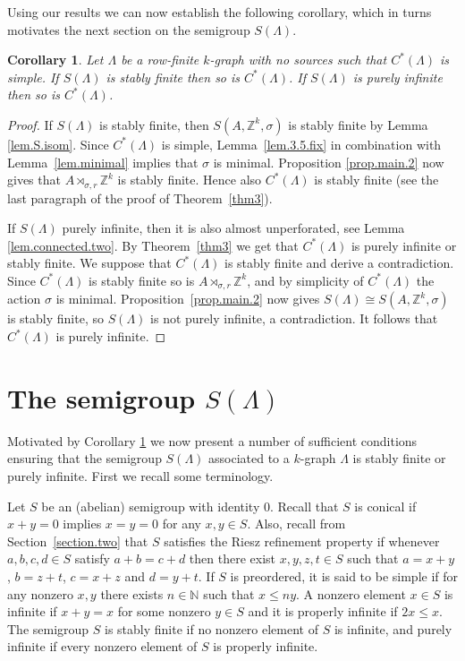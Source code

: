 \documentclass[a4paper, 12pt]{amsart}
\numberwithin{equation}{section}
\newcounter{theorem}
\newtheorem{cor}[theorem]{Corollary}
\theoremstyle{remark}
\theoremstyle{definition}
\begin{document}
Using our results we can now establish the following corollary, which in turns motivates
the next section on the semigroup $S(\Lambda)$.
\begin{cor}\label{stably.fin.purely.inf}
Let $\Lambda$ be a row-finite $k$-graph with no sources such that $C^*(\Lambda)$ is
simple. If $S(\Lambda)$ is stably finite then so is $C^*(\Lambda)$. If $S(\Lambda)$ is
purely infinite then so is $C^*(\Lambda)$.
\end{cor}
\begin{proof}
If $S(\Lambda)$ is stably finite, then $S(A,{\mathbb{Z}}^k,\sigma)$ is stably finite by Lemma
\ref{lem.S.isom}. Since $C^*(\Lambda)$ is simple, Lemma~\ref{lem.3.5.fix} in combination
with Lemma~\ref{lem.minimal} implies that $\sigma$ is minimal. Proposition
\ref{prop.main.2} now gives that $A\rtimes_{\sigma,r} {\mathbb{Z}}^k$ is stably finite. Hence also
$C^*(\Lambda)$ is stably finite (see the last paragraph of the proof of
Theorem~\ref{thm3}).

If $S(\Lambda)$ purely infinite, then it is also almost unperforated, see Lemma
\ref{lem.connected.two}. By Theorem~\ref{thm3} we get that $C^*(\Lambda)$ is purely
infinite or stably finite. We suppose that $C^*(\Lambda)$ is stably finite and derive a
contradiction. Since $C^*(\Lambda)$ is stably finite so is $A\rtimes_{\sigma,r} {\mathbb{Z}}^k$, and by
simplicity of $C^*(\Lambda)$ the action $\sigma$ is minimal. Proposition~\ref{prop.main.2}
now gives $S(\Lambda)\cong S(A,{\mathbb{Z}}^k,\sigma)$ is stably finite, so
$S(\Lambda)$ is not purely infinite, a contradiction. It follows that $C^*(\Lambda)$ is
purely infinite.
\end{proof}

\section{The semigroup \texorpdfstring{$S(\Lambda)$}{S(Lambda)}}

Motivated by Corollary \ref{stably.fin.purely.inf} we now present a number of sufficient
conditions ensuring that the semigroup $S(\Lambda)$ associated to a $k$-graph $\Lambda$
is stably finite or purely infinite. First we recall some terminology.

Let $S$ be an (abelian) semigroup with identity $0$. Recall that $S$ is conical if $x + y
= 0$ implies $x = y = 0$ for any $x,y\in S$. Also, recall from Section~\ref{section.two} that $S$ satisfies the Riesz
refinement property if whenever $a,b,c,d \in S$ satisfy $a + b = c + d$ then there exist
$x, y, z,t\in S$ such that $a = x + y$, $b = z + t$, $c = x + z$ and $d = y + t$. If $S$ is preordered, it is said to be simple if for any nonzero $x,y$ there
exists $n\in{\mathbb{N}}$ such that $x\leq ny$. A nonzero element $x\in S$ is infinite if $x+y=x$
for some nonzero $y\in S$ and it is properly infinite if $2x\leq x$. The semigroup $S$ is
stably finite if no nonzero element of $S$ is infinite, and purely infinite if every
nonzero element of $S$ is properly infinite.
\end{document}

